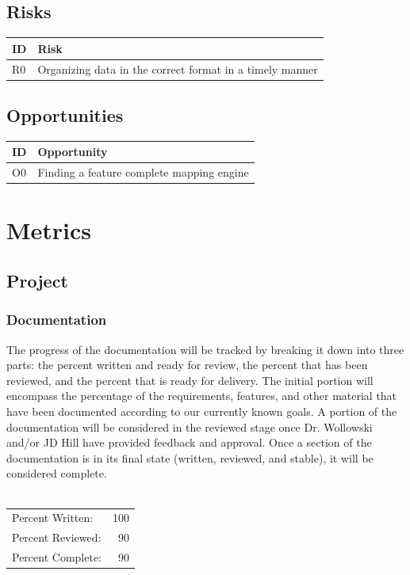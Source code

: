 \documentclass{article}
\begin{document}
\subsection{Risks}
\begin{tabular}{ | p{.5in} | p{4.5in} | }
\hline
\textbf{ID} & \textbf{Risk}\\
\hline
\hline
R0 & Organizing data in the correct format in a timely manner\\
\hline
\end{tabular}

\subsection{Opportunities}
\begin{tabular}{ | p{.5in} | p{4.5in} | }
\hline
\textbf{ID} & \textbf{Opportunity}\\
\hline
\hline
O0 & Finding a feature complete mapping engine\\
\hline
\end{tabular}

\section{Metrics}
\subsection{Project}
\subsubsection{Documentation}
The progress of the documentation will be tracked by breaking it down into three parts: the percent written and ready for review, the percent that has been reviewed, and the percent that is ready for delivery. The initial portion will encompass the percentage of the requirements, features, and other material that have been documented according to our currently known goals. A portion of the documentation will be considered in the reviewed stage once Dr. Wollowski and/or JD Hill have provided feedback and approval. Once a section of the documentation is in its final state (written, reviewed, and stable), it will be considered complete.\\ \\
\begin{tabular}{l r}
Percent Written: & 100 \\
Percent Reviewed: & 90 \\
Percent Complete: & 90 \\
\end{tabular}
\end{document}
